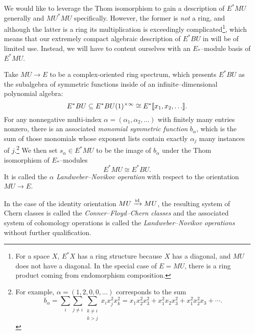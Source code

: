 We would like to leverage the Thom isomorphism to gain a description of $E^* MU$ generally and $MU^* MU$ specifically.  However, the former is \emph{not} a ring, and although the latter is a ring its multiplication is exceedingly complicated\footnote{For a space $X$, $E^* X$ has a ring structure because $X$ has a diagonal, and $MU$ does not have a diagonal.  In the special case of $E = MU$, there is a ring product coming from endomorphism composition.}, which means that our extremely compact algebraic description of $E^* BU$ in  will be of limited use.  Instead, we will have to content ourselves with an $E_*$--module basis of $E^* MU$.
\begin{definition}
Take $MU \to E$ to be a complex-oriented ring spectrum, which presents $E^* BU$ as the subalgebra of symmetric functions inside of an infinite--dimensional polynomial algebra: \[E^* BU \subseteq E^* BU(1)^{\times \infty} \cong E^*\llbracket{x_1, x_2, \ldots}\rrbracket.\]  For any nonnegative multi-index $\alpha = (\alpha_1, \alpha_2, \ldots)$ with finitely many entries nonzero, there is an associated \textit{monomial symmetric function} $b_\alpha$, which is the sum of those monomials whose exponent lists contain exactly $\alpha_j$ many instances of $j$.\footnote{For example, $\alpha = (1, 2, 0, 0, \ldots)$ corresponds to the sum \[b_\alpha = \sum_i \sum_{j \ne i} \sum_{\substack{k \ne i \\ k > j}} x_i x_j^2 x_k^2 = x_1 x_2^2 x_3^2 + x_1^2 x_2 x_3^2 + x_1^2 x_2^2 x_3 + \cdots.\]}  We then set $s_\alpha \in E^* MU$ to be the image of $b_\alpha$ under the Thom isomorphism of $E_*$--modules \[E^* MU \cong E^* BU.\]  It is called the \textit{$\alpha${\th} Landweber--Novikov operation} with respect to the orientation $MU \to E$.
\end{definition}

\begin{definition}
In the case of the identity orientation $MU \xrightarrow{\mathrm{id}} MU$, the resulting system of Chern classes is called the \textit{Conner--Floyd--Chern classes} and the associated system of cohomology operations is called the \textit{Landweber--Novikov operations} without further qualification.
\end{definition}

